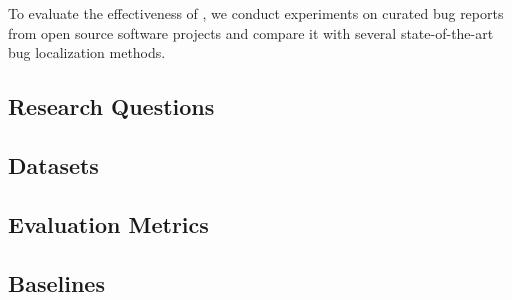 To evaluate the effectiveness of \TRANPCNN, we conduct experiments on curated bug reports from open source software projects and compare it with several state-of-the-art bug localization methods.

\subsection{Research Questions}


\subsection{Datasets}


\subsection{Evaluation Metrics}


\subsection{Baselines}


